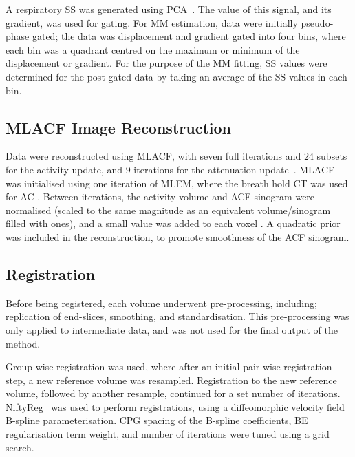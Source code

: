         A respiratory \gls{SS} was generated using \gls{PCA}~\cite{Thielemans2011}. The value of this signal, and its gradient, was used for gating. For \gls{MM} estimation, data were initially pseudo-phase gated; the data was displacement and gradient gated into four bins, where each bin was a quadrant centred on the maximum or minimum of the displacement or gradient. %
        For the purpose of the \gls{MM} fitting, \gls{SS} values were determined for the post-gated data by taking an average of the \gls{SS} values in each bin.
        
    \subsection{\acrshort{MLACF} Image Reconstruction} \label{sec:mlacf_image_reconstruction}
        Data were reconstructed using \acrshort{MLACF}, with seven full iterations and $24$ subsets for the activity update, and $9$ iterations for the attenuation update~\cite{Nuyts2012ML-reconstructionFactors}. \acrshort{MLACF} was initialised using one iteration of \acrshort{MLEM}, where the breath hold \acrshort{CT} was used for \gls{AC}%
        . Between iterations, the activity volume and \gls{ACF} sinogram were normalised (scaled to the same magnitude as an equivalent volume/sinogram filled with ones), and a small value was added to each voxel%
        . A quadratic prior was included in the reconstruction, to promote smoothness of the \gls{ACF} sinogram.
    
    
    \subsection{Registration} \label{sec:registration}
        Before being registered, each volume underwent pre-processing, including; replication of end-slices, smoothing, and standardisation. This pre-processing was only applied to intermediate data, and was not used for the final output of the method.
        
        Group-wise registration was used, where after an initial pair-wise registration step, a new reference volume was resampled. Registration to the new reference volume, followed by another resample, continued for a set number of iterations. NiftyReg~\cite{Modat2010} was used to perform registrations, using a diffeomorphic velocity field B-spline parameterisation. \acrlong{CPG} spacing of the B-spline coefficients, \acrlong{BE} regularisation term weight, and number of iterations were tuned using a grid search.
        
